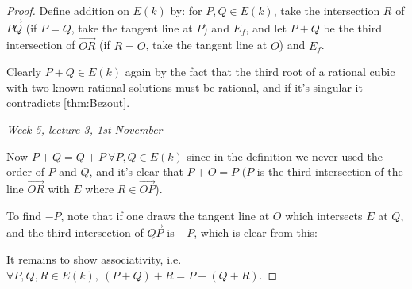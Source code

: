 \documentclass{article}
\theoremstyle{definition}
\begin{document}
\begin{proof}
Define addition on $E(k)$ by: for $P,Q\in E(k)$, take the intersection $R$ of $\overrightarrow{PQ}$ (if $P=Q$, take the tangent line at $P$) and $E_f$, and let $P+Q$ be the third intersection of $\overrightarrow{OR}$ (if $R=O$, take the tangent line at $O$) and $E_f$.

Clearly $P+Q\in E(k)$ again by the fact that the third root of a rational cubic with two known rational solutions must be rational, and if it's singular it contradicts \ref{thm:Bezout}.

\begin{flushright}
\textit{Week 5, lecture 3, 1st November}
\end{flushright}

Now $P+Q=Q+P \ \forall P,Q\in E(k)$ since in the definition we never used the order of $P$ and $Q$, and it's clear that $P+O=P$ ($P$ is the third intersection of the line $\overrightarrow{OR}$ with $E$ where $R\in\overrightarrow{OP}$).

To find $-P$, note that if one draws the tangent line at $O$ which intersects $E$ at $Q$, and the third intersection of $\overrightarrow{QP}$ is $-P$, which is clear from this:

\begin{center}
\end{center}

It remains to show associativity, i.e. $\forall P,Q,R\in E(k),\ (P+Q)+R=P+(Q+R)$.


\end{proof}
\end{document}
